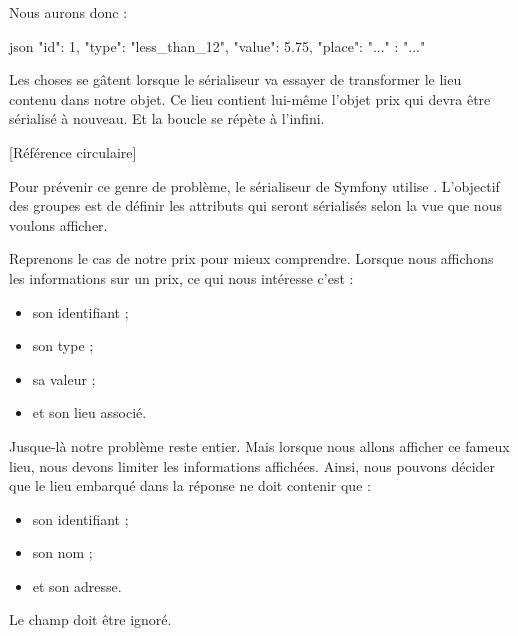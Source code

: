 \documentclass[big]{zmdocument}
\begin{document}
Nous aurons donc :



\begin{CodeBlock}{json}
{
    "id": 1,
    "type": "less_than_12",
    "value": 5.75,
    "place": {
        "..." : "..."
    }
}
\end{CodeBlock}



Les choses se gâtent lorsque le sérialiseur va essayer de transformer le lieu contenu dans notre objet. Ce lieu contient lui-même l'objet prix qui devra être sérialisé à nouveau. Et la boucle se répète à l'infini.



[Référence circulaire]


Pour prévenir ce genre de problème, le sérialiseur de Symfony utilise . L'objectif des groupes est de définir les attributs qui seront sérialisés selon la vue que nous voulons afficher.



Reprenons le cas de notre prix pour mieux comprendre. Lorsque nous affichons les informations sur un prix, ce qui nous intéresse c'est :



\begin{itemize}
\item son identifiant ;
\item son type ;
\item sa valeur ;
\item et son lieu associé.
\end{itemize}


Jusque-là notre problème reste entier. Mais lorsque nous allons afficher ce fameux lieu, nous devons limiter les informations affichées. Ainsi, nous pouvons décider que le lieu embarqué dans la réponse ne doit contenir que :



\begin{itemize}
\item son identifiant ;
\item son nom ;
\item et son adresse.
\end{itemize}


Le champ  doit être ignoré.
\end{document}
